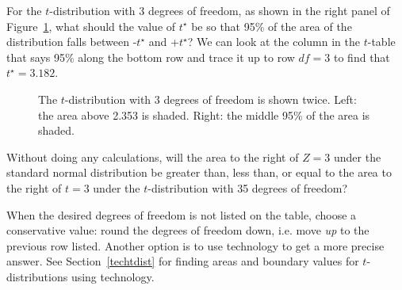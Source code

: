 \begin{examplewrap}
\begin{nexample}{For the $t$-distribution with 3 degrees of freedom, as shown in the right panel of Figure~\ref{tDistDF3}, what should the value of $t^{\star}$ be so that 95\% of the area of the distribution falls between -$t^{\star}$ and +$t^{\star}$?}
We can look at the column in the $t$-table that says 95\% along the bottom row and trace it up to row $df = 3$ to find that $t^{\star} = 3.182$.
\end{nexample}
\end{examplewrap}


\begin{figure}
\centering
\caption{The $t$-distribution with 3 degrees of freedom is shown twice.  Left: the area above 2.353 is shaded.  Right: the middle 95\% of the area is shaded. }
\label{tDistDF3}
\end{figure}

\begin{exercisewrap}
\begin{nexercise}Without doing any calculations, will the area to the right of $Z=3$ under the standard normal distribution be greater than, less than, or equal to the area to the right of $t=3$ under the $t$-distribution with 35 degrees of freedom?\footnotemark
\end{nexercise}
\end{exercisewrap} 


When the desired degrees of freedom is not listed on the table, choose a conservative value: round the degrees of freedom down, i.e. move \emph{up} to the previous row listed. Another option is to use technology to get a more precise answer.  See Section~\ref{techtdist} for finding areas and boundary values for $t$-distributions using technology.


